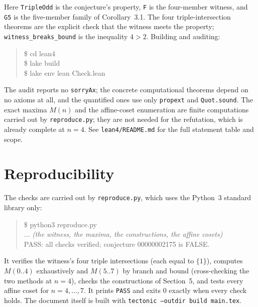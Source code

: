 \documentclass[11pt]{article}
\theoremstyle{definition}
\theoremstyle{remark}
\begin{document}
\noindent Here \texttt{TripleOdd} is the conjecture's property, \texttt{F} is
the four-member witness, and \texttt{G5} is the five-member family of
Corollary~3.1. The four triple-intersection theorems are the explicit check
that the witness meets the property; \texttt{witness\_breaks\_bound} is the
inequality $4 > 2$. Building and auditing:

\begin{quote}\ttfamily
\$ cd lean4\\
\$ lake build\\
\$ lake env lean Check.lean
\end{quote}

\noindent The audit reports no \texttt{sorryAx}; the concrete computational
theorems depend on no axioms at all, and the quantified ones use only
\texttt{propext} and \texttt{Quot.sound}. The exact maxima $M(n)$ and the
affine-coset enumeration are finite computations carried out by
\texttt{reproduce.py}; they are not needed for the refutation, which is already
complete at $n = 4$. See \texttt{lean4/README.md} for the full statement table
and scope.

\section{Reproducibility}

The checks are carried out by \texttt{reproduce.py}, which uses the Python~3
standard library only:

\begin{quote}\ttfamily
\$ python3 reproduce.py\\
... \textit{(the witness, the maxima, the constructions, the affine cosets)}\\
PASS: all checks verified; conjecture 00000002175 is FALSE.
\end{quote}

It verifies the witness's four triple intersections (each equal to $\{1\}$),
computes $M(0..4)$ exhaustively and $M(5..7)$ by branch and bound (cross-checking
the two methods at $n = 4$), checks the constructions of Section~5, and tests
every affine coset for $n = 4, \dots, 7$. It prints \texttt{PASS} and exits $0$
exactly when every check holds. The document itself is built with
\texttt{tectonic --outdir build main.tex}.
\end{document}
